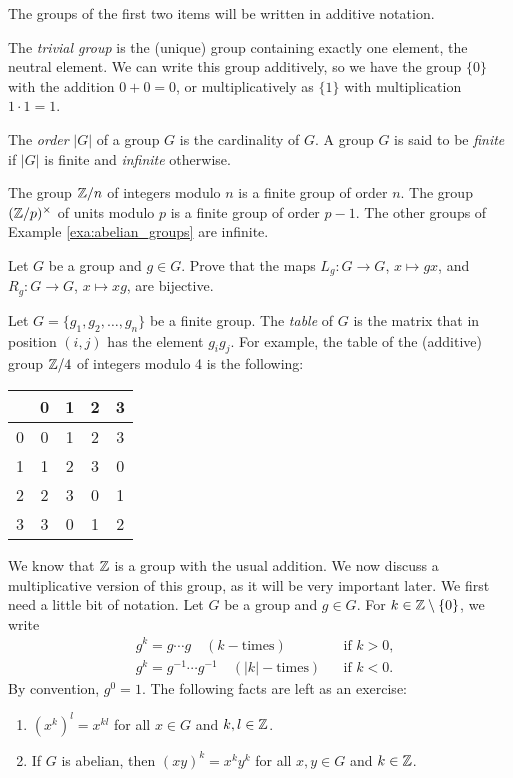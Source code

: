 The groups of the first two items will be written in additive notation. 

The \emph{trivial group} is the (unique) group containing exactly one element, the neutral element. We can write this group additively, so we have the group $\{0\}$ with the addition $0+0=0$, or multiplicatively as $\{1\}$ with multiplication $1\cdot 1=1$. 

\begin{definition}
    The \emph{order} $|G|$ of a group $G$ is the 
    cardinality of $G$. A group $G$ is said to be
    \emph{finite} if $|G|$ is finite and \emph{infinite}
    otherwise. 
\end{definition}

The group $\mathbb{Z}/n$ of integers modulo $n$ is a finite group of order $n$. 
The group $(\mathbb{Z}/p)^{\times}$ of units modulo $p$ is a finite
group of order $p-1$. The other groups of Example \ref{exa:abelian_groups} are infinite. 

\begin{exercise}
\label{xca:LR}
Let $G$ be a group and $g\in G$. Prove that 
the maps $L_g\colon G\to G$, $x\mapsto gx$, and 
$R_g\colon G\to G$, $x\mapsto xg$, are bijective. 
\end{exercise}

Let $G=\{g_1,g_2,\dots,g_n\}$ be a finite group. The \emph{table} 
of $G$ is the matrix 
that in position $(i,j)$ has the element $g_ig_j$. 
For example, the table of 
the (additive) group  
$\mathbb{Z}/4$ of integers modulo 4 is the following:
\begin{center}
  \begin{tabular}{l|cccc}
     &0&1&2&3 \\
    \hline
    0 & 0 & 1 & 2 & 3\\
    1 & 1 & 2 & 3 & 0\\
    2 & 2 & 3 & 0 & 1\\
    3 & 3 & 0 & 1 & 2
  \end{tabular}
\end{center}

We know that $\mathbb{Z}$ is a group with the usual addition. 
We now discuss a multiplicative version of this group, as it will be
very important later. We first need a little bit of notation. 
Let $G$ be a group and $g\in G$. For $k\in\mathbb{Z}\setminus\{0\}$, we write 
\begin{align*}
    & g^k=g\cdots g\quad (k-\text{times}) && \text{if $k>0$},\\
    & g^k=g^{-1}\cdots g^{-1}\quad (|k|-\text{times}) && \text{if $k<0$}.
\end{align*}
By convention, $g^0=1$.
The following facts are left as an exercise: 
\begin{enumerate}
    \item $(x^k)^l=x^{kl}$ for all $x\in G$ and $k,l\in\mathbb{Z}$.
    \item If $G$ is abelian, then $(xy)^k=x^ky^k$ for all $x,y\in G$ and $k\in\mathbb{Z}$.
\end{enumerate}

